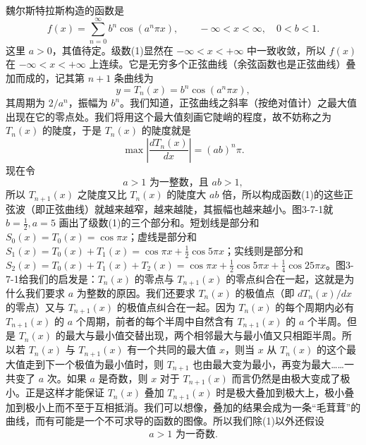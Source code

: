 魏尔斯特拉斯构造的函数是
\begin{equation}
 f(x)=\sum_{n=0}^{\infty}b^n\cos(a^n\pi x),
 \qquad -\infty<x<\infty,\quad 0<b<1.
 \tag{1}
\end{equation}
这里 $a>0$，其值待定。级数(1)显然在 $-\infty<x<+\infty$ 中一致收敛，所以 $f(x)$ 在 $-\infty<x<+\infty$ 上连续。它是无穷多个正弦曲线（余弦函数也是正弦曲线）叠加而成的，记其第 $n+1$ 条曲线为
\[
 y=T_n(x)=b^n\cos(a^n\pi x),
\]
其周期为 $2/a^n$，振幅为 $b^n$。我们知道，正弦曲线之斜率（按绝对值计）之最大值出现在它的零点处。我们将用这个最大值刻画它陡峭的程度，故不妨称之为 $T_n(x)$ 的陡度，于是 $T_n(x)$ 的陡度就是
\[
 \max\left|\frac{dT_n(x)}{dx}\right|=(ab)^n\pi.
\]
现在令
\begin{equation}
 a>1\text{ 为一整数，且 }ab>1,
 \tag{2}
\end{equation}
所以 $T_{n+1}(x)$ 之陡度又比 $T_n(x)$ 的陡度大 $ab$ 倍，所以构成函数(1)的这些正弦波（即正弦曲线）就越来越窄，越来越陡，其振幅也越来越小。图3-7-1就 $b=\frac12,a=5$ 画出了级数(1)的三个部分和。短划线是部分和 $S_0(x)=T_0(x)=\cos\pi x$；虚线是部分和 $S_1(x)=T_0(x)+T_1(x)=\cos\pi x+\frac12\cos5\pi x$；实线则是部分和 $S_2(x)=T_0(x)+T_1(x)+T_2(x)=\cos\pi x+\frac12\cos5\pi x+\frac14\cos25\pi x$。图3-7-1给我们的启发是：$T_n(x)$ 的零点与 $T_{n+1}(x)$ 的零点纠合在一起，这就是为什么我们要求 $a$ 为整数的原因。我们还要求 $T_n(x)$ 的极值点（即 $dT_n(x)/dx$ 的零点）又与 $T_{n+1}(x)$ 的极值点纠合在一起。因为 $T_n(x)$ 的每个周期内必有 $T_{n+1}(x)$ 的 $a$ 个周期，前者的每个半周中自然含有 $T_{n+1}(x)$ 的 $a$ 个半周。但是 $T_n(x)$ 的最大与最小值交替出现，两个相邻最大与最小值又只相距半周。所以若 $T_n(x)$ 与 $T_{n+1}(x)$ 有一个共同的最大值 $x$，则当 $x$ 从 $T_n(x)$ 的这个最大值走到下一个极值为最小值时，则 $T_{n+1}$ 也由最大变为最小，再变为最大……一共变了 $a$ 次。如果 $a$ 是奇数，则 $x$ 对于 $T_{n+1}(x)$ 而言仍然是由极大变成了极小。正是这样才能保证 $T_n(x)$ 叠加 $T_{n+1}(x)$ 时是极大叠加到极大上，极小叠加到极小上而不至于互相抵消。我们可以想像，叠加的结果会成为一条“毛茸茸”的曲线，而有可能是一个不可求导的函数的图像。所以我们除(1)以外还假设
\begin{equation}
 a>1\text{ 为一奇数}.
 \tag{3}
\end{equation}

